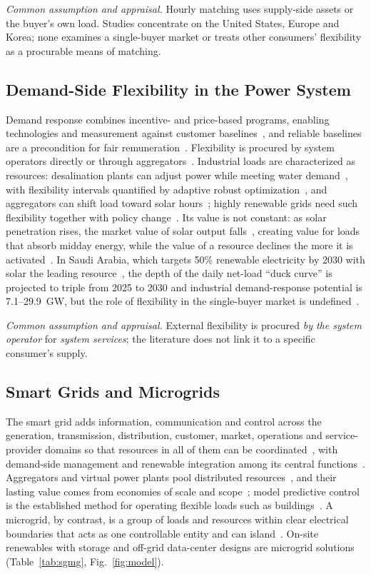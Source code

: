 \documentclass[conference]{IEEEtran}
\begin{document}
\emph{Common assumption and appraisal.} Hourly matching uses supply-side assets or the buyer's own load. Studies concentrate on the United States, Europe and Korea; none examines a single-buyer market or treats other consumers' flexibility as a procurable means of matching.

\subsection{Demand-Side Flexibility in the Power System}
Demand response combines incentive- and price-based programs, enabling technologies and measurement against customer baselines~\cite{r17}, and reliable baselines are a precondition for fair remuneration~\cite{r45}. Flexibility is procured by system operators directly or through aggregators~\cite{r18}. Industrial loads are characterized as resources: desalination plants can adjust power while meeting water demand~\cite{r20}, with flexibility intervals quantified by adaptive robust optimization~\cite{r19}, and aggregators can shift load toward solar hours~\cite{r21}; highly renewable grids need such flexibility together with policy change~\cite{r25}. Its value is not constant: as solar penetration rises, the market value of solar output falls~\cite{r44}, creating value for loads that absorb midday energy, while the value of a resource declines the more it is activated~\cite{r23,r27}. In Saudi Arabia, which targets 50\% renewable electricity by 2030 with solar the leading resource~\cite{r36,r37,r48}, the depth of the daily net-load ``duck curve'' is projected to triple from 2025 to 2030 and industrial demand-response potential is 7.1--29.9~GW, but the role of flexibility in the single-buyer market is undefined~\cite{r23}.

\emph{Common assumption and appraisal.} External flexibility is procured \emph{by the system operator} for \emph{system services}; the literature does not link it to a specific consumer's supply.

\subsection{Smart Grids and Microgrids}
The smart grid adds information, communication and control across the generation, transmission, distribution, customer, market, operations and service-provider domains so that resources in all of them can be coordinated~\cite{r54,r55}, with demand-side management and renewable integration among its central functions~\cite{r56,r57}. Aggregators and virtual power plants pool distributed resources~\cite{r58}, and their lasting value comes from economies of scale and scope~\cite{r59}; model predictive control is the established method for operating flexible loads such as buildings~\cite{r60}. A microgrid, by contrast, is a group of loads and resources within clear electrical boundaries that acts as one controllable entity and can island~\cite{r61,r62,r63}. On-site renewables with storage and off-grid data-center designs are microgrid solutions (Table~\ref{tab:sgmg}, Fig.~\ref{fig:model}).
\end{document}
